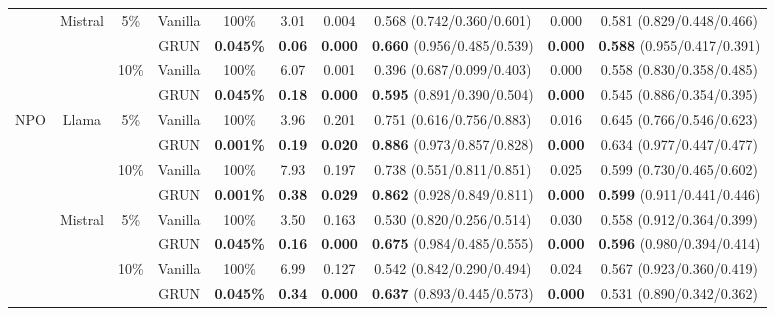 \begin{table*}[t]
{\begin{tabular}{lccccc|cc|cc}
        & \multirow{4}{*}{Mistral} & \multirow{2}{*}{5\%} & Vanilla & 100\% & 3.01 & 0.004 & 0.568  {\small(0.742/0.360/0.601)} & 0.000 & 0.581  {\small(0.829/0.448/0.466)} \\
        & ~ & ~ & GRUN & \textbf{0.045\%} &\textbf{0.06} & \textbf{0.000} & \textbf{0.660}  {\small(0.956/0.485/0.539)} & \textbf{0.000} & \textbf{0.588}  {\small(0.955/0.417/0.391)} \\ 
        & ~ & \multirow{2}{*}{10\%} & Vanilla & 100\% & 6.07 & 0.001 & 0.396  {\small(0.687/0.099/0.403)} & 0.000 & 0.558  {\small(0.830/0.358/0.485)} \\ 
        & ~ & ~ & GRUN & \textbf{0.045\%} &\textbf{0.18} & \textbf{0.000} & \textbf{0.595}  {\small(0.891/0.390/0.504)} & \textbf{0.000} & 0.545  {\small(0.886/0.354/0.395)} \\ \midrule
        
        \multirow{8}{*}{NPO} & \multirow{4}{*}{Llama} & \multirow{2}{*}{5\%} & Vanilla & 100\% & 3.96 & 0.201 & 0.751  {\small(0.616/0.756/0.883)} & 0.016 & 0.645  {\small(0.766/0.546/0.623)} \\
        & ~ & ~ & GRUN & \textbf{0.001\%} & \textbf{0.19} & \textbf{0.020} & \textbf{0.886}  {\small(0.973/0.857/0.828)} & \textbf{0.000} & 0.634  {\small(0.977/0.447/0.477)} \\
        & ~ & \multirow{2}{*}{10\%} & Vanilla & 100\% & 7.93 & 0.197 & 0.738  {\small(0.551/0.811/0.851)} & 0.025 & 0.599  {\small(0.730/0.465/0.602)} \\ 
        & ~ & ~ & GRUN & \textbf{0.001\%} & \textbf{0.38} & \textbf{0.029} & \textbf{0.862}  {\small(0.928/0.849/0.811)} &\textbf{ 0.000} & \textbf{0.599}  {\small(0.911/0.441/0.446)} \\ \cmidrule(lr){2-10}
        
        & \multirow{4}{*}{Mistral} & \multirow{2}{*}{5\%} & Vanilla & 100\% & 3.50 & 0.163 & 0.530  {\small(0.820/0.256/0.514)} & 0.030 & 0.558  {\small(0.912/0.364/0.399)} \\
        & ~ & ~ & GRUN & \textbf{0.045\%} &\textbf{0.16} & \textbf{0.000} & \textbf{0.675}  {\small(0.984/0.485/0.555)} & \textbf{0.000} & \textbf{0.596}  {\small(0.980/0.394/0.414)} \\
        & ~ & \multirow{2}{*}{10\%} & Vanilla & 100\% & 6.99 & 0.127 & 0.542  {\small(0.842/0.290/0.494)} & 0.024 & 0.567  {\small(0.923/0.360/0.419)} \\ 
        & ~ & ~ & GRUN & \textbf{0.045\%} &\textbf{0.34} & \textbf{0.000} & \textbf{0.637}  {\small(0.893/0.445/0.573)} & \textbf{0.000} & 0.531  {\small(0.890/0.342/0.362)} \\ \midrule
        

\end{tabular}}
\end{table*}
